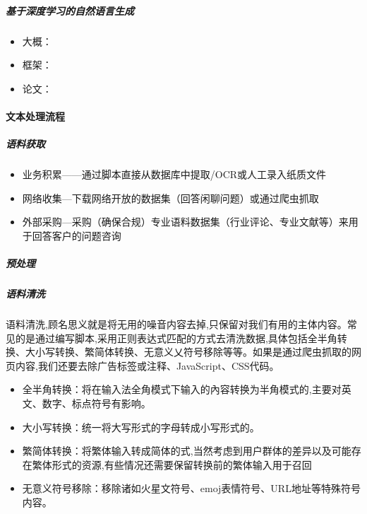 \documentclass[letterpaper,10pt,english]{sphinxmanual}
\begin{document}
\subparagraph{基于深度学习的自然语言生成}
\label{\detokenize{chapter_AI_dive/NLP:id9}}\begin{itemize}
\item {} 
大概：

\item {} 
框架：

\item {} 
论文：

\end{itemize}


\paragraph{文本处理流程}
\label{\detokenize{chapter_AI_dive/NLP:id10}}

\subparagraph{语料获取}
\label{\detokenize{chapter_AI_dive/NLP:id11}}\begin{itemize}
\item {} 
业务积累——通过脚本直接从数据库中提取/OCR或人工录入纸质文件

\item {} 
网络收集—下载网络开放的数据集（回答闲聊问题）或通过爬虫抓取

\item {} 
外部采购—采购（确保合规）专业语料数据集（行业评论、专业文献等）来用于回答客户的问题咨询

\end{itemize}


\subparagraph{预处理}
\label{\detokenize{chapter_AI_dive/NLP:id12}}

\subparagraph{语料清洗}
\label{\detokenize{chapter_AI_dive/NLP:id13}}
语料清洗,顾名思义就是将无用的噪音内容去掉,只保留对我们有用的主体内容。常见的是通过编写脚本,采用正则表达式匹配的方式去清洗数据,具体包括全半角转换、大小写转换、繁简体转换、无意义乂符号移除等等。如果是通过爬虫抓取的网页内容,我们还要去除广告标签或注释、JavaScript、CSS代码。
\begin{itemize}
\item {} 
全半角转换：将在输入法全角模式下输入的內容转换为半角模式的,主要对英文、数字、标点符号有影响。

\item {} 
大小写转换：统一将大写形式的字母转成小写形式的。

\item {} 
繁简体转换：将繁体输入转成简体的式,当然考虑到用户群体的差异以及可能存在繁体形式的资源,有些情况还需要保留转换前的繁体输入用于召回

\item {} 
无意义符号移除：移除诸如火星文符号、emoj表情符号、URL地址等特殊符号内容。

\end{itemize}
\end{document}
